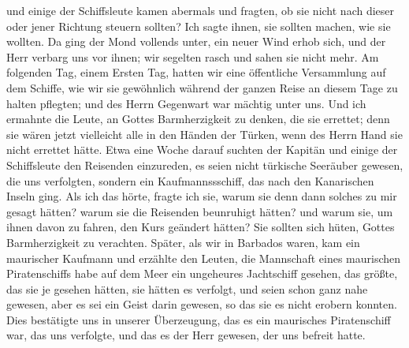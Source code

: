 und einige der Schiffsleute kamen abermals und fragten, ob sie
nicht nach dieser oder jener Richtung steuern sollten? Ich sagte
ihnen, sie sollten machen, wie sie wollten. Da ging der Mond
vollends unter, ein neuer Wind erhob sich, und der Herr verbarg
uns vor ihnen; wir segelten rasch und sahen sie nicht mehr. Am
folgenden Tag, einem Ersten Tag, hatten wir eine öffentliche
Versammlung auf dem Schiffe, wie wir sie gewöhnlich während
der ganzen Reise an diesem Tage zu halten pflegten; und des
Herrn Gegenwart war mächtig unter uns. Und ich ermahnte die
Leute, an Gottes Barmherzigkeit zu denken, die sie errettet; denn
sie wären jetzt vielleicht alle in den Händen der Türken, wenn
des Herrn Hand sie nicht errettet hätte. Etwa eine Woche
darauf suchten der Kapitän und einige der Schiffsleute den
Reisenden einzureden, es seien nicht türkische Seeräuber gewesen,
die uns verfolgten, sondern ein Kaufmannssschiff, das nach den
Kanarischen Inseln ging. Als ich das hörte, fragte ich sie,
warum sie denn dann solches zu mir gesagt hätten? warum sie
die Reisenden beunruhigt hätten? und warum sie, um ihnen
davon zu fahren, den Kurs geändert hätten? Sie sollten sich
hüten, Gottes Barmherzigkeit zu verachten. Später, als wir in
Barbados waren, kam ein maurischer Kaufmann und erzählte den
Leuten, die Mannschaft eines maurischen Piratenschiffs habe auf
dem Meer ein ungeheures Jachtschiff gesehen, das größte, das
sie je gesehen hätten, sie hätten es verfolgt, und seien schon ganz
nahe gewesen, aber es sei ein Geist darin gewesen, so das sie es
nicht erobern konnten. Dies bestätigte uns in unserer Überzeugung,
das es ein maurisches Piratenschiff war, das uns verfolgte, und
das es der Herr gewesen, der uns befreit hatte.

